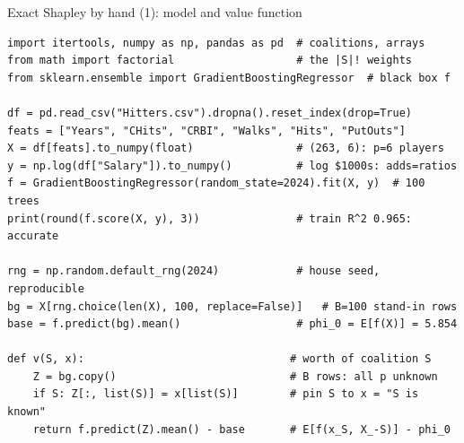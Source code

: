 \documentclass[aspectratio=169,11pt]{beamer}
\begin{document}
\begin{frame}[fragile]{Exact Shapley by hand (1): model and value function}
  \begin{lstlisting}[basicstyle=\ttfamily\scriptsize]
import itertools, numpy as np, pandas as pd  # coalitions, arrays
from math import factorial                   # the |S|! weights
from sklearn.ensemble import GradientBoostingRegressor  # black box f

df = pd.read_csv("Hitters.csv").dropna().reset_index(drop=True)
feats = ["Years", "CHits", "CRBI", "Walks", "Hits", "PutOuts"]
X = df[feats].to_numpy(float)                # (263, 6): p=6 players
y = np.log(df["Salary"]).to_numpy()          # log $1000s: adds=ratios
f = GradientBoostingRegressor(random_state=2024).fit(X, y)  # 100 trees
print(round(f.score(X, y), 3))               # train R^2 0.965: accurate

rng = np.random.default_rng(2024)            # house seed, reproducible
bg = X[rng.choice(len(X), 100, replace=False)]   # B=100 stand-in rows
base = f.predict(bg).mean()                  # phi_0 = E[f(X)] = 5.854

def v(S, x):                                # worth of coalition S
    Z = bg.copy()                           # B rows: all p unknown
    if S: Z[:, list(S)] = x[list(S)]        # pin S to x = "S is known"
    return f.predict(Z).mean() - base       # E[f(x_S, X_-S)] - phi_0
  \end{lstlisting}
\end{frame}
\end{document}
